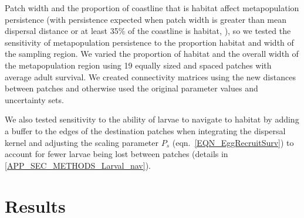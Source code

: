 \documentclass[12pt, oneside]{article}   	%
\begin{document}
Patch width and the proportion of coastline that is habitat affect metapopulation persistence (with persistence expected when patch width is greater than mean dispersal distance or at least 35\% of the coastline is habitat, \cite{botsford2001dependence}), so we tested the sensitivity of metapopulation persistence to the proportion habitat and width of the sampling region. We varied the proportion of habitat and the overall width of the metapopulation region using 19 equally sized and spaced patches with average adult survival. We created connectivity matrices using the new distances between patches and otherwise used the original parameter values and uncertainty sets. 

We also tested sensitivity to the ability of larvae to navigate to habitat by adding a buffer to the edges of the destination patches when integrating the dispersal kernel and adjusting the scaling parameter $P_s$ (eqn.\ \ref{EQN_EggRecruitSurv}) to account for fewer larvae being lost between patches (details in \ref{APP_SEC_METHODS_Larval_nav}).

\section*{Results}  


\end{document}
